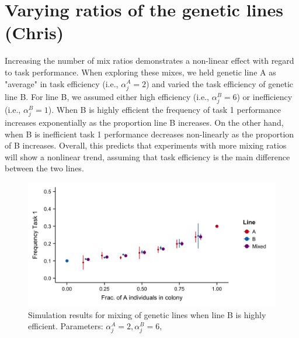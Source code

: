 \documentclass[11pt]{article}
\begin{document}

\section{Varying ratios of the genetic lines (Chris)}
Increasing the number of mix ratios demonstrates a non-linear effect with regard to task performance. When exploring these mixes, we held genetic line A as "average" in task efficiency (i.e., $\alpha_j^A = 2$) and varied the task efficiency of genetic line B. For line B, we assumed either high efficiency (i.e., $\alpha_j^B = 6$) or inefficiency (i.e., $\alpha_j^B = 1$). When B is highly efficient the frequency of task 1 performance increases exponentially as the proportion line B increases. On the other hand, when B is inefficient task 1 performance decreases non-linearly as the proportion of B increases. Overall, this predicts that experiments with more mixing ratios will show a nonlinear trend, assuming that task efficiency is the main difference between the two lines. 

\begin{figure}[H]
    \centering
    \includegraphics[trim={0 0.25in 0 0.2in}, clip, width=0.9\linewidth]{doc/Mix_Alphas_B-super-efficient_Means.png}
    \caption{Simulation results for mixing of genetic lines when line B is highly efficient. Parameters: $\alpha_j^A = 2, \alpha_j^B = 6,$}
    \label{fig:Mix_Alphas_B-efficient}
\end{figure}
\end{document}
